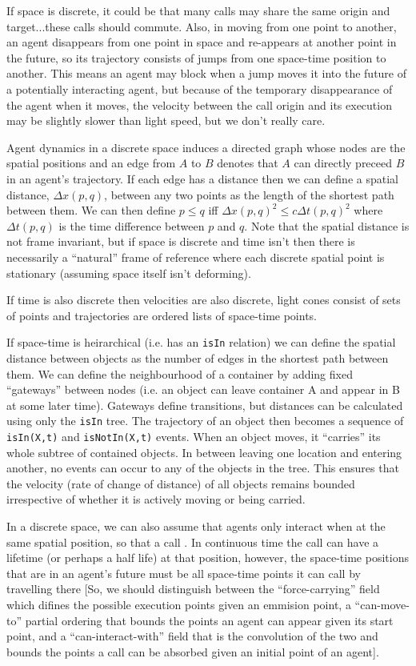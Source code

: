 \documentclass[a4paper]{article}
\begin{document}
If space is discrete, it could be that many calls may share the same origin and target...these calls should commute. Also, in moving from one point to another, an agent disappears from one point in space and re-appears at another point in the future, so its trajectory consists of jumps from one space-time position to another. This means an agent may block when a jump moves it into the future of a potentially interacting agent, but because of the temporary disappearance of the agent when it moves, the velocity between the call origin and its execution may be slightly slower than light speed, but we don't really care.

Agent dynamics in a discrete space induces a directed graph whose nodes are the spatial positions and an edge from $A$ to $B$ denotes that $A$ can directly preceed $B$ in an agent's trajectory. If each edge has a distance then we can define a spatial distance, $\Delta x(p,q)$, between any two points as the length of the shortest path between them. We can then define $p \le q$ iff $\Delta x(p,q)^2 \le c\Delta t(p,q)^2$ where $\Delta t(p,q)$ is the time difference between $p$ and $q$. Note that the spatial distance is not frame invariant, but if space is discrete and time isn't then there is necessarily a ``natural'' frame of reference where each discrete spatial point is stationary (assuming space itself isn't deforming).

If time is also discrete then velocities are also discrete, light cones consist of sets of points and trajectories are ordered lists of space-time points.

If space-time is heirarchical (i.e. has an \texttt{isIn} relation) we can define the spatial distance between objects as the number of edges in the shortest path between them. We can define the neighbourhood of a container by adding fixed ``gateways'' between nodes (i.e. an object can leave container A and appear in B at some later time). Gateways define transitions, but distances can be calculated using only the \texttt{isIn} tree. The trajectory of an object then becomes a sequence of \texttt{isIn(X,t)} and \texttt{isNotIn(X,t)} events. When an object moves, it ``carries'' its whole subtree of contained objects. In between leaving one location and entering another, no events can occur to any of the objects in the tree. This ensures that the velocity (rate of change of distance) of all objects remains bounded irrespective of whether it is actively moving or being carried.

In a discrete space, we can also assume that agents only interact when at the same spatial position, so that a call . In continuous time the call can have a lifetime (or perhaps a half life) at that position, however, the space-time positions that are in an agent's future must be all space-time points it can call by travelling there [So, we should distinguish between the ``force-carrying'' field which difines the possible execution points given an emmision point, a ``can-move-to'' partial ordering that bounds the points an agent can appear given its start point, and a ``can-interact-with'' field that is the convolution of the two and bounds the points a call can be absorbed given an initial point of an agent].
\end{document}
